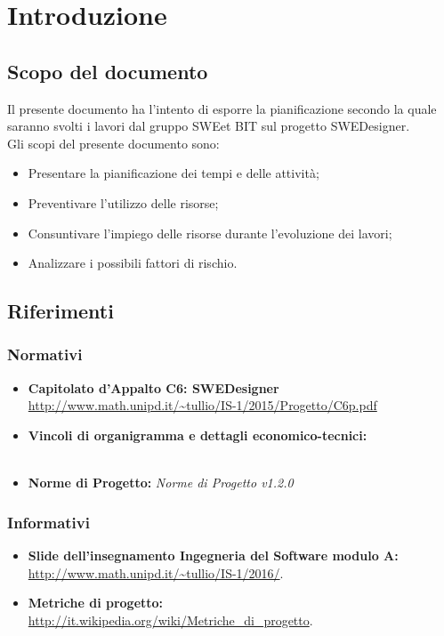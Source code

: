 \section{Introduzione}
\subsection{Scopo del documento}
Il presente documento ha l'intento di esporre la pianificazione secondo la quale saranno svolti i lavori dal gruppo SWEet BIT sul progetto SWEDesigner. \\
Gli scopi del presente documento sono: \\
\begin{itemize}
	\item Presentare la pianificazione dei tempi e delle attività;
	\item Preventivare l'utilizzo delle risorse;
	\item Consuntivare l'impiego delle risorse durante l'evoluzione dei lavori;
	\item Analizzare i possibili fattori di rischio. \\
\end{itemize}
\subsection{Riferimenti}
\subsubsection{Normativi}
\begin{itemize}
	\item \textbf{Capitolato d'Appalto C6: SWEDesigner} \\
		\url{http://www.math.unipd.it/~tullio/IS-1/2015/Progetto/C6p.pdf} \\
	\item \textbf{Vincoli di organigramma e dettagli economico-tecnici:} \\
		 \\
	\item \textbf{Norme di Progetto:} \textit{Norme di Progetto v1.2.0} \\
\end{itemize}
\subsubsection{Informativi}
\begin{itemize}
	\item \textbf{Slide dell'insegnamento Ingegneria del Software modulo A:} \\
		\url{http://www.math.unipd.it/~tullio/IS-1/2016/}. \\
	\item \textbf{Metriche di progetto:} \\
		\url{http://it.wikipedia.org/wiki/Metriche_di_progetto}. \\
\end{itemize}
